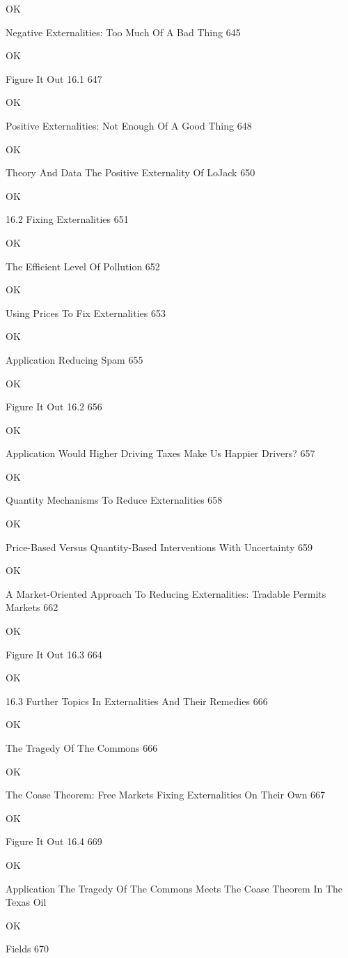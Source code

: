 OK

Negative Externalities: Too Much Of A Bad Thing 645

OK

Figure It Out 16.1 647

OK

Positive Externalities: Not Enough Of A Good Thing 648

OK

Theory And Data The Positive Externality Of LoJack 650

OK

16.2 Fixing Externalities 651

OK

The Efficient Level Of Pollution 652

OK

Using Prices To Fix Externalities 653

OK

Application Reducing Spam 655

OK

Figure It Out 16.2 656

OK

Application Would Higher Driving Taxes Make Us Happier Drivers? 657

OK

Quantity Mechanisms To Reduce Externalities 658

OK

Price-Based Versus Quantity-Based Interventions With Uncertainty 659

OK

A Market-Oriented Approach To Reducing Externalities: Tradable Permits Markets 662

OK

Figure It Out 16.3 664

OK

16.3 Further Topics In Externalities And Their Remedies 666

OK

The Tragedy Of The Commons 666

OK

The Coase Theorem: Free Markets Fixing Externalities On Their Own 667

OK

Figure It Out 16.4 669

OK

Application The Tragedy Of The Commons Meets The Coase Theorem In The Texas Oil

OK

Fields 670

